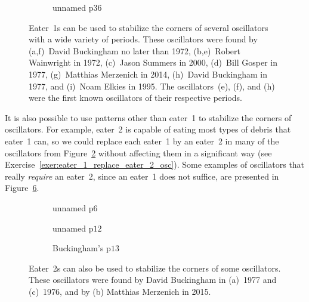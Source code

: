 \begin{figure}[!htb]
\begin{subfigure}{.3\textwidth}
	\end{subfigure}%
	\begin{subfigure}{.33\textwidth}%
		\centering
		\caption{unnamed p36}
		\label{fig:period_36}
	\end{subfigure}
	\caption{Eater~1s can be used to stabilize the corners of several oscillators with a wide variety of periods. These oscillators were found by (a,f)~David Buckingham no later than 1972, (b,e)~Robert Wainwright in 1972, (c)~Jason Summers in 2000, (d)~Bill Gosper in 1977, (g)~Matthias Merzenich in 2014, (h)~David Buckingham in 1977, and (i)~Noam Elkies in 1995. The oscillators~(e), (f), and (h) were the first known oscillators of their respective periods.}
	\label{fig:eater_1_oscillators}
\end{figure}

It is also possible to use patterns other than eater~1 to stabilize the corners of oscillators. For example, eater~2 is capable of eating most types of debris that eater~1 can, so we could replace each eater~1 by an eater~2 in many of the oscillators from Figure~\ref{fig:eater_1_oscillators} without affecting them in a significant way (see Exercise~\ref{exer:eater_1_replace_eater_2_osc}). Some examples of oscillators that really \emph{require} an eater~2, since an eater~1 does not suffice, are presented in Figure~\ref{fig:eater_2_oscillators}.

\begin{figure}[!htb]
	\centering
	\begin{subfigure}{.3\textwidth}
		\centering
		\caption{unnamed p$6$} %
		\label{fig:eater_2_p6}
	\end{subfigure}%
	\begin{subfigure}{.3\textwidth}
		\centering
		\caption{unnamed p$12$} %
		\label{fig:eater_2_p12}
	\end{subfigure}%
	\begin{subfigure}{.36\textwidth}
		\centering
		\caption{Buckingham's p$13$} %
		\label{fig:eater_2_p13}
	\end{subfigure}%
	\caption{Eater~2s can also be used to stabilize the corners of some oscillators. These oscillators were found by David Buckingham in (a)~1977 and (c)~1976, and by (b) Matthias Merzenich in 2015.}
	\label{fig:eater_2_oscillators}
\end{figure}

